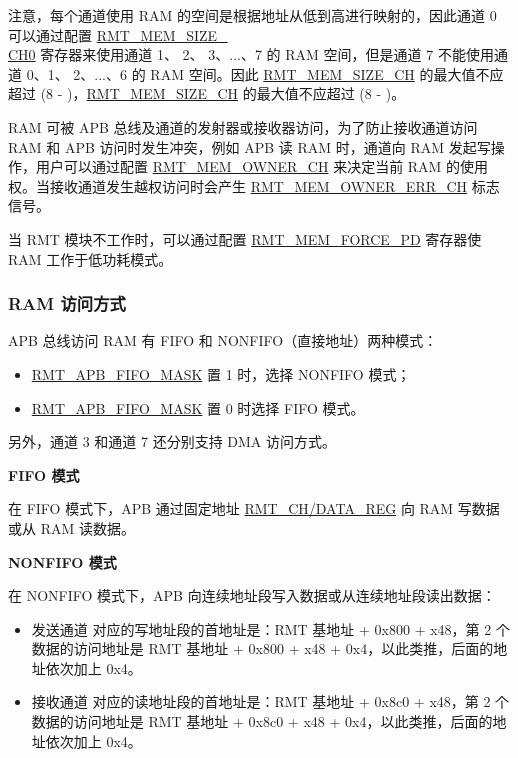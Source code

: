\documentclass[main\_\_CN.tex]{subfiles}
\begin{document}
注意，每个通道使用 RAM 的空间是根据地址从低到高进行映射的，因此通道 0 可以通过配置 \hyperref[fielddesc:RMTMEMSIZECHN]{RMT\_MEM\_SIZE\_\\CH0} 寄存器来使用通道 1、 2、 3、...、7 的 RAM 空间，但是通道 7 不能使用通道 0、1、 2、...、6 的 RAM 空间。因此 \hyperref[fielddesc:RMTMEMSIZECHN]{RMT\_MEM\_SIZE\_CH} 的最大值不应超过 (8 - )，\hyperref[fielddesc:RMTMEMSIZECHM]{RMT\_MEM\_SIZE\_CH} 的最大值不应超过 (8 - )。

RAM 可被 APB 总线及通道的发射器或接收器访问，为了防止接收通道访问 RAM 和 APB 访问时发生冲突，例如 APB 读 RAM 时，通道向 RAM 发起写操作，用户可以通过配置 \hyperref[fielddesc:RMTMEMOWNERCHM]{RMT\_MEM\_OWNER\_CH} 来决定当前 RAM 的使用权。当接收通道发生越权访问时会产生 \hyperref[fielddesc:RMTMEMOWNERERRCHM]{RMT\_MEM\_OWNER\_ERR\_CH} 标志信号。

当 RMT 模块不工作时，可以通过配置 \hyperref[fielddesc:RMTMEMFORCEPD]{RMT\_MEM\_FORCE\_PD} 寄存器使 RAM 工作于低功耗模式。

\subsubsection{RAM 访问方式}

APB 总线访问 RAM 有 FIFO 和 NONFIFO（直接地址）两种模式：

\begin{itemize}
    \item \hyperref[fielddesc:RMTAPBFIFOMASK]{RMT\_APB\_FIFO\_MASK} 置 1 时，选择 NONFIFO 模式；
    \item \hyperref[fielddesc:RMTAPBFIFOMASK]{RMT\_APB\_FIFO\_MASK} 置 0 时选择 FIFO 模式。
\end{itemize}

另外，通道 3 和通道 7 还分别支持 DMA 访问方式。

\textbf{FIFO 模式}

在 FIFO 模式下，APB 通过固定地址 \hyperref[regdesc:RMTCHNDATAREG]{RMT\_CH/DATA\_REG} 向 RAM 写数据或从 RAM 读数据。

\textbf{NONFIFO 模式}

在 NONFIFO 模式下，APB 向连续地址段写入数据或从连续地址段读出数据：
\begin{itemize}
    \item 发送通道  对应的写地址段的首地址是：RMT 基地址 + 0x800 + x48，第 2 个数据的访问地址是 RMT 基地址 + 0x800 + x48 + 0x4，以此类推，后面的地址依次加上 0x4。
    \item 接收通道  对应的读地址段的首地址是：RMT 基地址 + 0x8c0 + x48，第 2 个数据的访问地址是 RMT 基地址 + 0x8c0 + x48 + 0x4，以此类推，后面的地址依次加上 0x4。
\end{itemize}
\end{document}
